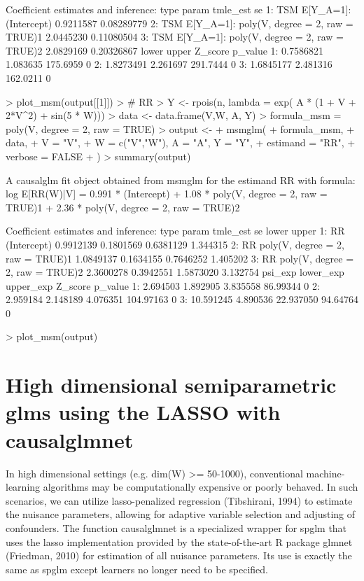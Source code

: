\documentclass[article]{jss}
\begin{document}
\begin{Schunk}
\begin{Soutput}
Coefficient estimates and inference:
   type                                        param  tmle_est         se
1:  TSM                      E[Y_{A=1}]: (Intercept) 0.9211587 0.08289779
2:  TSM E[Y_{A=1}]: poly(V, degree = 2, raw = TRUE)1 2.0445230 0.11080504
3:  TSM E[Y_{A=1}]: poly(V, degree = 2, raw = TRUE)2 2.0829169 0.20326867
       lower    upper  Z_score p_value
1: 0.7586821 1.083635 175.6959       0
2: 1.8273491 2.261697 291.7444       0
3: 1.6845177 2.481316 162.0211       0
\end{Soutput}
\begin{Sinput}
>  plot_msm(output[[1]])
> # RR
> Y <- rpois(n, lambda = exp( A * (1 + V + 2*V^2)  + sin(5 * W)))
> data <- data.frame(V,W, A, Y)
> formula_msm = ~ poly(V, degree = 2, raw = TRUE) 
> output <-
+   msmglm(
+     formula_msm,
+     data,
+     V = "V",
+     W = c("V","W"), A = "A", Y = "Y",
+     estimand = "RR",
+     verbose = FALSE
+   )
> summary(output)
\end{Sinput}
\begin{Soutput}
A causalglm fit object obtained from msmglm for the estimand RR with formula: 
log E[RR(W)|V] = 0.991 * (Intercept) + 1.08 * poly(V, degree = 2, raw = TRUE)1 + 2.36 * poly(V, degree = 2, raw = TRUE)2

Coefficient estimates and inference:
   type                            param  tmle_est        se     lower    upper
1:   RR                      (Intercept) 0.9912139 0.1801569 0.6381129 1.344315
2:   RR poly(V, degree = 2, raw = TRUE)1 1.0849137 0.1634155 0.7646252 1.405202
3:   RR poly(V, degree = 2, raw = TRUE)2 2.3600278 0.3942551 1.5873020 3.132754
     psi_exp lower_exp upper_exp   Z_score p_value
1:  2.694503  1.892905  3.835558  86.99344       0
2:  2.959184  2.148189  4.076351 104.97163       0
3: 10.591245  4.890536 22.937050  94.64764       0
\end{Soutput}
\begin{Sinput}
> plot_msm(output)
\end{Sinput}
\end{Schunk}


\section{High dimensional semiparametric glms using the LASSO with causalglmnet}
In high dimensional settings (e.g. dim(W) >= 50-1000), conventional machine-learning algorithms may be computationally expensive or poorly behaved. In such scenarios, we can utilize lasso-penalized regression (Tibshirani, 1994) to estimate the nuisance parameters, allowing for adaptive variable selection and adjusting of confounders. The function causalglmnet is a specialized wrapper for spglm that uses the lasso implementation provided by the state-of-the-art R package glmnet (Friedman, 2010) for estimation of all nuisance parameters.\nocite{Friedman2010}\nocite{Tibshirani94regressionshrinkage} Its use is exactly the same as spglm except learners no longer need to be specified.
\end{document}
